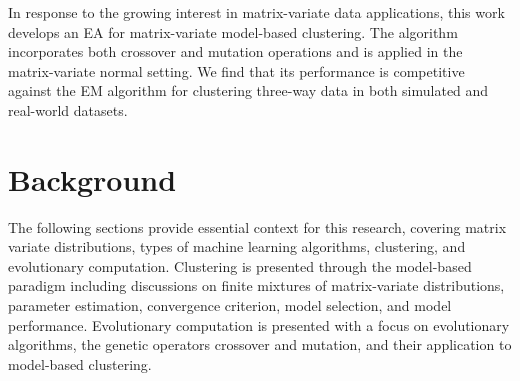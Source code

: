 \documentclass[12pt]{report}
\begin{document}
In response to the growing interest in matrix-variate data applications, this work develops an EA for matrix-variate model-based clustering. The algorithm incorporates both crossover and mutation operations and is applied in the matrix-variate normal setting. We find that its performance is competitive against the EM algorithm for clustering three-way data in both simulated and real-world datasets.   






\chapter{Background}
The following sections provide essential context for this research, covering matrix variate distributions, types of machine learning algorithms, clustering, and evolutionary computation. Clustering is presented through the model-based paradigm including discussions on finite mixtures of matrix-variate distributions, parameter estimation, convergence criterion, model selection, and model performance. Evolutionary computation is presented with a focus on evolutionary algorithms, the genetic operators crossover and mutation, and their application to model-based clustering. 



\end{document}
